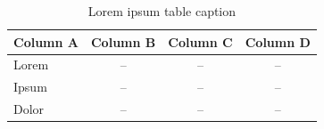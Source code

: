 \begin{table}[ht!]
    \centering
    \renewcommand{\arraystretch}{1.5}
    \caption{Lorem ipsum table caption}
    \begin{tabular}{lccc}
        \hline
        \textbf{Column A} & \textbf{Column B} & \textbf{Column C} & \textbf{Column D} \\ \hline
        Lorem             & --                & --                & --                \\
        Ipsum             & --                & --                & --                \\
        Dolor             & --                & --                & --                \\ \hline
    \end{tabular}
    \label{table-repo-stats}
\end{table}
